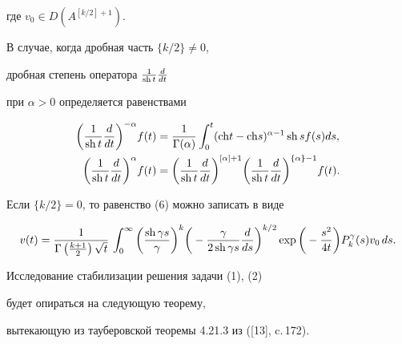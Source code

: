 где $v_0\in D(A^{[k/2]+1})$.





В случае, когда дробная часть $\{k/2\}\neq0$,


дробная степень оператора $\frac{1}{\operatorname{sh} t} \frac{d}{dt}$


при $\alpha > 0$ определяется равенствами 


\begin{align*}


\bigg(\frac{1}{\sh t} \frac{d}{dt}\bigg)^{-\alpha}f(t)&=


\frac{1}{\Gamma(\alpha)}


\int_0^t ({\ch} t-{\ch} s)^{\alpha-1}


\sh s f(s) ds,\\


%


\bigg(\frac{1}{\sh t} \frac{d}{dt}\bigg)^{\alpha}f(t)&=


\bigg(\frac{1}{\sh t} \frac{d}{dt}\bigg)^{[\alpha]+1}


\bigg(\frac{1}{\sh t} \frac{d}{dt}\bigg)^{\{\alpha\}-1}f(t).


\end{align*}





Если $\{k/2\}=0$, то равенство (6) можно записать в виде


\begin{equation}


v(t)=\frac{1}{\Gamma\left(\frac{k+1}{2}\right) \sqrt t}\,


\int_0^\infty \bigg(\frac{\sh \gamma s}


{\gamma}\bigg)^k


\bigg(-\frac{\gamma}{2 \sh \gamma s} \frac{d}{ds}\bigg)^{k/2}


\exp\bigg(-\frac{s^2}{4t}\bigg) P_k^\gamma(s)v_0\, ds.


\end{equation}





Исследование стабилизации решения задачи (1), (2)


будет опираться на следующую теорему,


вытекающую из тауберовской теоремы 4.21.3 из ([13], c.\,172).





